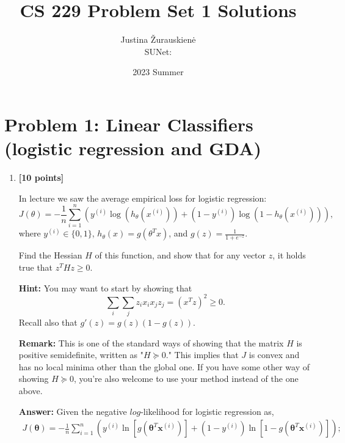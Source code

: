 \documentclass{article}
\title{CS 229 Problem Set 1 Solutions}
\date{2023 Summer}
\author{Justina \v{Z}urauskien\.{e} \\ SUNet: }
\newcommand{\bl}[1]{\boldsymbol{#1}}
\begin{document}
\maketitle

\section*{Problem 1: Linear Classifiers (logistic regression and GDA)}

\begin{enumerate}[label=\alph*)]
    \item \textbf{[10 points]}

In lecture we saw the average empirical loss for logistic regression:
\[ J(\theta) = -\frac{1}{n} \sum_{i=1}^{n} \left( y^{(i)} \log(h_\theta(x^{(i)})) + (1 - y^{(i)}) \log(1 - h_\theta(x^{(i)})) \right), \]
where $y^{(i)} \in \{0, 1\}$, $h_\theta(x) = g(\theta^T x)$, and $g(z) = \frac{1}{1 + e^{-z}}$.

Find the Hessian $H$ of this function, and show that for any vector $z$, it holds true that $z^T H z \geq 0$.

\textbf{Hint:} You may want to start by showing that
\[ \sum_{i} \sum_{j} z_i x_i x_j z_j = (x^T z)^2 \geq 0. \]
Recall also that $g'(z) = g(z)(1 - g(z))$.

\textbf{Remark:} This is one of the standard ways of showing that the matrix $H$ is positive semidefinite, written as "$H \succeq 0$." This implies that $J$ is convex and has no local minima other than the global one. If you have some other way of showing $H \succeq 0$, you're also welcome to use your method instead of the one above.

\textbf{Answer:}    
    Given the negative $log$-likelihood for logistic regression as,
    \begin{align*}
        J(\bl{\theta}) = -\frac{1}{n} \sum\limits_{i=1}^{n} \left( y^{(i)} \ln[g(\bl{\theta}^T\bl{x}^{(i)})] + (1-y^{(i)}) \ln[1-g(\bl{\theta}^T\bl{x}^{(i)}) ]   \right);
    \end{align*}


\end{enumerate}
\end{document}
